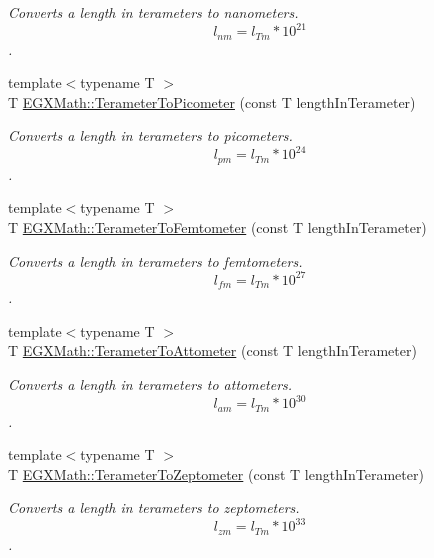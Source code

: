 \begin{DoxyCompactItemize}
\begin{DoxyCompactList}\small\item\em Converts a length in terameters to nanometers. \[ l_{nm}=l_{Tm} * 10^{21} \]. \end{DoxyCompactList}\item 
{\footnotesize template$<$typename T $>$ }\\T \mbox{\hyperlink{group___e_g_x_math-_conversions-_length_conversions-_s_i-_terameter-_s_i_ga131f3ccf4db05a31f5bd5c9487da9a4e}{E\+G\+X\+Math\+::\+Terameter\+To\+Picometer}} (const T length\+In\+Terameter)
\begin{DoxyCompactList}\small\item\em Converts a length in terameters to picometers. \[ l_{pm}=l_{Tm} * 10^{24} \]. \end{DoxyCompactList}\item 
{\footnotesize template$<$typename T $>$ }\\T \mbox{\hyperlink{group___e_g_x_math-_conversions-_length_conversions-_s_i-_terameter-_s_i_ga3baa4e53ebd4305bc80d9b998720eba5}{E\+G\+X\+Math\+::\+Terameter\+To\+Femtometer}} (const T length\+In\+Terameter)
\begin{DoxyCompactList}\small\item\em Converts a length in terameters to femtometers. \[ l_{fm}=l_{Tm} * 10^{27} \]. \end{DoxyCompactList}\item 
{\footnotesize template$<$typename T $>$ }\\T \mbox{\hyperlink{group___e_g_x_math-_conversions-_length_conversions-_s_i-_terameter-_s_i_ga985f6a434acb7bb9b9ceeaeb55172cdf}{E\+G\+X\+Math\+::\+Terameter\+To\+Attometer}} (const T length\+In\+Terameter)
\begin{DoxyCompactList}\small\item\em Converts a length in terameters to attometers. \[ l_{am}=l_{Tm} * 10^{30} \]. \end{DoxyCompactList}\item 
{\footnotesize template$<$typename T $>$ }\\T \mbox{\hyperlink{group___e_g_x_math-_conversions-_length_conversions-_s_i-_terameter-_s_i_ga2347b883d209d99cd37a4f273a1c6920}{E\+G\+X\+Math\+::\+Terameter\+To\+Zeptometer}} (const T length\+In\+Terameter)
\begin{DoxyCompactList}\small\item\em Converts a length in terameters to zeptometers. \[ l_{zm}=l_{Tm} * 10^{33} \]. \end{DoxyCompactList}\item 

\end{DoxyCompactItemize}
